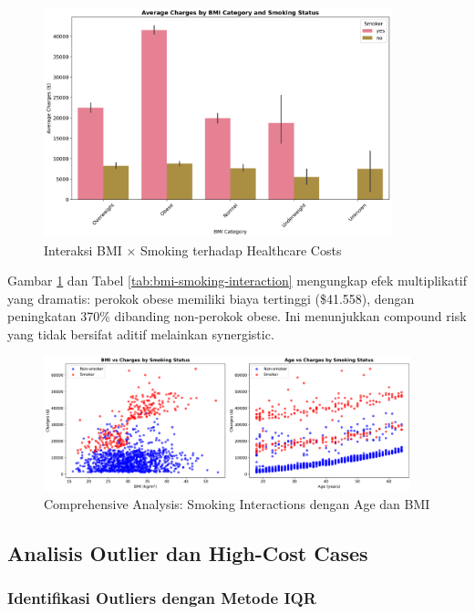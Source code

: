 \begin{figure}[H]
\centering
\includegraphics[width=0.9\textwidth]{../results/plots/07_bmi_smoking_interaction.png}
\caption{Interaksi BMI × Smoking terhadap Healthcare Costs}
\label{fig:bmi-smoking-interaction}
\end{figure}

Gambar \ref{fig:bmi-smoking-interaction} dan Tabel \ref{tab:bmi-smoking-interaction} mengungkap efek multiplikatif yang dramatis: perokok obese memiliki biaya tertinggi (\$41.558), dengan peningkatan 370\% dibanding non-perokok obese. Ini menunjukkan compound risk yang tidak bersifat aditif melainkan synergistic.

\begin{figure}[H]
\centering
\includegraphics[width=0.95\textwidth]{../results/plots/06_smoking_interactions.png}
\caption{Comprehensive Analysis: Smoking Interactions dengan Age dan BMI}
\label{fig:smoking-interactions}
\end{figure}

\subsection{Analisis Outlier dan High-Cost Cases}
\label{subsec:analisis-outlier}

\subsubsection{Identifikasi Outliers dengan Metode IQR}

